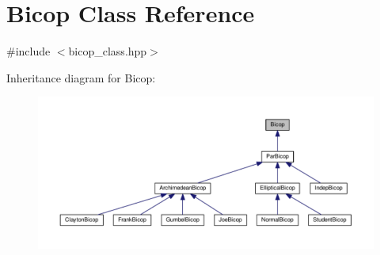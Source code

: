 \hypertarget{class_bicop}{\section{Bicop Class Reference}
\label{class_bicop}
}


{\ttfamily \#include $<$bicop\+\_\+class.\+hpp$>$}



Inheritance diagram for Bicop\+:
\nopagebreak
\begin{figure}[H]
\begin{center}
\leavevmode
\includegraphics[width=350pt]{class_bicop__inherit__graph}
\end{center}
\end{figure}
